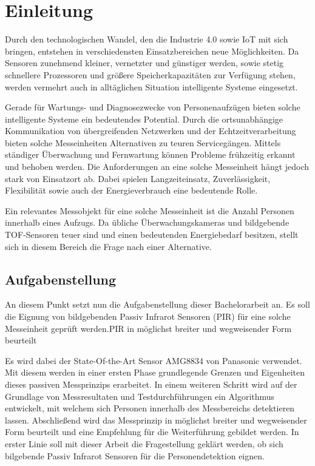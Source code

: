 \chapter{Einleitung}
\label{chap:Einleitung}


\label{sec:Ausgangssituation}
Durch den technologischen Wandel, den die Industrie 4.0 sowie \ac{IoT}  mit sich bringen, entstehen in verschiedensten Einsatzbereichen neue Möglichkeiten. Da Sensoren zunehmend kleiner, vernetzter und günstiger werden, sowie stetig schnellere Prozessoren und größere Speicherkapazitäten zur Verfügung stehen, werden vermehrt auch in alltäglichen Situation intelligente Systeme eingesetzt. 

Gerade für Wartungs- und Diagnosezwecke von Personenaufzügen bieten solche intelligente Systeme ein bedeutendes Potential. Durch die ortsunabhängige Kommunikation von übergreifenden Netzwerken und der Echtzeitverarbeitung bieten solche Messeinheiten Alternativen zu teuren Servicegängen. Mittels ständiger Überwachung und Fernwartung können Probleme frühzeitig erkannt und behoben werden. Die Anforderungen an eine solche Messeinheit hängt jedoch stark von Einsatzort ab. Dabei spielen Langzeiteinsatz, Zuverlässigkeit, Flexibilität sowie auch der Energieverbrauch eine bedeutende Rolle.

Ein relevantes Messobjekt für eine solche Messeinheit ist die Anzahl Personen innerhalb eines Aufzugs. Da übliche Überwachungskameras und bildgebende TOF-Sensoren teuer sind und einen bedeutenden Energiebedarf besitzen, stellt sich in diesem Bereich die Frage nach einer Alternative.

\section{Aufgabenstellung}
\label{chap:Aufgabenstellung}

An diesem Punkt setzt nun die Aufgabenstellung dieser Bachelorarbeit an. Es soll die Eignung von bildgebenden Passiv Infrarot Sensoren (PIR) für eine solche Messeinheit geprüft werden.PIR in möglichst breiter und wegweisender Form beurteilt

 Es wird dabei der State-Of-the-Art Sensor AMG8834 von Panasonic verwendet. Mit diesem werden in einer ersten Phase grundlegende Grenzen und Eigenheiten dieses passiven Messprinzips erarbeitet. In einem weiteren Schritt wird auf der Grundlage von Messresultaten und Testdurchführungen ein Algorithmus entwickelt, mit welchem sich Personen innerhalb des Messbereichs detektieren lassen. Abschließend wird das Messprinzip in möglichst breiter und wegweisender Form beurteilt und eine Empfehlung für die Weiterführung gebildet werden. In erster Linie soll mit dieser Arbeit die Fragestellung geklärt werden, ob sich bilgebende Passiv Infrarot Sensoren für die Personendetektion eignen.

